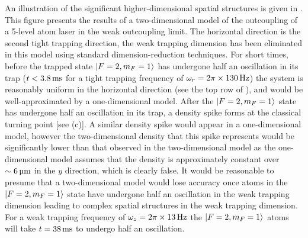 An illustration of the significant higher-dimensional spatial structures is given in .  This figure presents the results of a two-dimensional model of the outcoupling of a 5-level atom laser in the weak outcoupling limit.  The horizontal direction is the second tight trapping direction, the weak trapping dimension has been eliminated in this model using standard dimension-reduction techniques.  For short times, before the trapped state ${\left|F=2, m_F=1\right>}$ has undergone half an oscillation in its trap ($t < \unit[3.8]{ms}$ for a tight trapping frequency of $\omega_r = 2\pi \times \unit[130]{Hz}$) the system is reasonably uniform in the horizontal direction (see the top row of ), and would be well-approximated by a one-dimensional model.  After the ${\left|F=2, m_F=1\right>}$ state has undergone half an oscillation in its trap, a density spike forms at the classical turning point [see (c)].  A similar density spike would appear in a one-dimensional model, however the two-dimensional density that this spike represents would be significantly lower than that observed in the two-dimensional model as the one-dimensional model assumes that the density is approximately constant over $\sim\unit[6]{\micro m}$ in the $y$ direction, which is clearly false.  It would be reasonable to presume that a two-dimensional model would lose accuracy once atoms in the ${\left|F=2, m_F=1\right>}$ state have undergone half an oscillation in the weak trapping dimension leading to complex spatial structures in the weak trapping dimension.  For a weak trapping frequency of $\omega_z = 2\pi \times \unit[13]{Hz}$ the ${\left|F=2, m_F=1\right>}$ atoms will take $t = \unit[38]{ms}$ to undergo half an oscillation.


